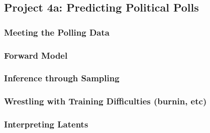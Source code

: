 \subsection*{Project 4a: Predicting Political Polls}

\subsubsection*{Meeting the Polling Data}
\subsubsection*{Forward Model}
\subsubsection*{Inference through Sampling}
\subsubsection*{Wrestling with Training Difficulties (burnin, etc)}
\subsubsection*{Interpreting Latents}
